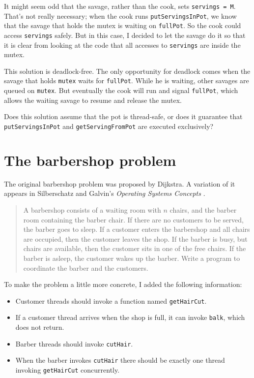 \documentclass{book}
\newcommand{\clearemptydoublepage}{\newpage\cleardoublepage}
\begin{document}
It might seem odd that the savage, rather than the cook, sets
{\tt servings = M}.  That's not really necessary; when the cook
runs {\tt putServingsInPot}, we know that the savage that holds
the mutex is waiting on {\tt fullPot}.  So the cook could
access {\tt servings} safely.  But in this case, I decided to
let the savage do it so that it is clear from looking at the
code that all accesses to {\tt servings} are inside the mutex.

This solution is deadlock-free.  The only opportunity for
deadlock comes when the savage that holds {\tt mutex} waits
for {\tt fullPot}.  While he is waiting, other savages are
queued on {\tt mutex}.  But eventually the cook will run and
signal {\tt fullPot}, which allows the waiting savage
to resume and release the mutex.

Does this solution assume that the pot is thread-safe, or does it
guarantee that {\tt putServingsInPot} and {\tt getServingFromPot}
are executed exclusively?


\clearemptydoublepage
\section{The barbershop problem}

The original barbershop problem was proposed by
Dijkstra.  A variation of it appears in 
Silberschatz and Galvin's {\em Operating Systems Concepts}
\cite{silberschatz}.

\begin {quotation}
A barbershop consists of a waiting room with $n$ chairs, and the
barber room containing the barber chair.  If there are no customers to
be served, the barber goes to sleep.  If a customer enters the
barbershop and all chairs are occupied, then the customer leaves the
shop.  If the barber is busy, but chairs are available, then the
customer sits in one of the free chairs.  If the barber is asleep, the
customer wakes up the barber.  Write a program to coordinate the
barber and the customers.
\end{quotation}

To make the problem a little more concrete, I added the
following information:

\begin{itemize}

\item Customer threads should invoke a function named {\tt getHairCut}.

\item If a customer thread arrives when the shop is full, 
it can invoke {\tt balk}, which does not return.

\item Barber threads should invoke {\tt cutHair}.

\item When the barber invokes {\tt cutHair} there should
be exactly one thread invoking {\tt getHairCut} concurrently.

\end{itemize}
\end{document}
